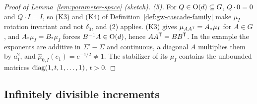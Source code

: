 \begin{proof}[Proof of Lemma~\ref{lem:parameter-space} (sketch)]
\emph{(5).} For $Q \in \mathrm{O}(d) \subseteq G$, $Q \cdot 0 = 0$ and $Q \cdot I = I$, so (K3) and (K4)
of Definition~\ref{def:gw-cascade-family} make $\mu_I$ rotation invariant and not $\delta_0$, and (2)
applies. (K3) gives $\mu_{AA^{\mathsf{T}}} = A_*\mu_I$ for $A \in G$, and $A_*\mu_I = B_*\mu_I$ forces
$B^{-1}A \in \mathrm{O}(d)$, hence $AA^{\mathsf{T}} = BB^{\mathsf{T}}$. In the example the exponents are additive in
$\Sigma' - \Sigma$ and continuous, a diagonal $A$ multiplies them by $a_1^2$, and
$\widehat\mu_{0,I}(e_1) = e^{-1/2} \ne 1$. The stabilizer of its $\mu_I$ contains the unbounded
matrices $\operatorname{diag}(1, t, 1, \dots, 1)$, $t > 0$.
\end{proof}

\subsection{Infinitely divisible increments}

